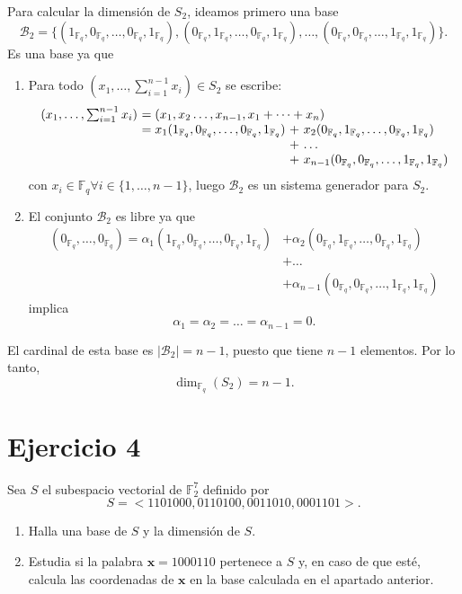\begin{enumerate}[label=\alph*)]
	Para calcular la dimensión de $S_2$, ideamos primero una base
	\[\mathcal{B}_2 = \{(1_{\mathbb{F}_q},0_{\mathbb{F}_q},\dots,0_{\mathbb{F}_q},1_{\mathbb{F}_q}), (0_{\mathbb{F}_q},1_{\mathbb{F}_q},\dots,0_{\mathbb{F}_q},1_{\mathbb{F}_q}),\dots,(0_{\mathbb{F}_q},0_{\mathbb{F}_q},\dots,1_{\mathbb{F}_q},1_{\mathbb{F}_q})\}.\]
	Es una base ya que
	\begin{enumerate}[label=\arabic*)]
		\item Para todo $(x_1,\dots,\sum_{i=1}^{n-1}x_i)\in S_2$ se escribe:
		\[
			\begin{array}{r@{\ }l@{\ }l@{\ }l}
				(x_1,\dots,\sum_{i=1}^{n-1}x_i)&= \mathrlap{(x_1,x_2\dots,x_{n-1},x_1+\dots+x_n)}\\
				&= x_1(1_{\mathbb{F}_q},0_{\mathbb{F}_q},\dots,0_{\mathbb{F}_q},1_{\mathbb{F}_q}) &+& x_2(0_{\mathbb{F}_q},1_{\mathbb{F}_q},\dots,0_{\mathbb{F}_q},1_{\mathbb{F}_q})\\
				&	&+& \dots\\
				&	&+& x_{n-1}(0_{\mathbb{F}_q},0_{\mathbb{F}_q},\dots,1_{\mathbb{F}_q},1_{\mathbb{F}_q})
			\end{array}
		\]
		con $x_i\in\mathbb{F}_q\forall i\in\{1,\dots,n-1\}$, luego $\mathcal{B}_2$ es un sistema generador para $S_2$.
		
		\item El conjunto $\mathcal{B}_2$ es libre ya que
		\begin{align*}
			(0_{\mathbb{F}_q},\dots,0_{\mathbb{F}_q}) = \alpha_1(1_{\mathbb{F}_q},0_{\mathbb{F}_q},\dots,0_{\mathbb{F}_q},1_{\mathbb{F}_q}) &+ \alpha_2(0_{\mathbb{F}_q},1_{\mathbb{F}_q},\dots,0_{\mathbb{F}_q},1_{\mathbb{F}_q})\\
			&+ \dots\\
			&+ \alpha_{n-1}(0_{\mathbb{F}_q},0_{\mathbb{F}_q},\dots,1_{\mathbb{F}_q},1_{\mathbb{F}_q})
		\end{align*}
		implica
		\[\alpha_1=\alpha_2=\dots=\alpha_{n-1}=0.\]
	\end{enumerate}
	El cardinal de esta base es $|\mathcal{B}_2| = n-1$, puesto que tiene $n-1$ elementos. Por lo tanto,
	\[\dim_{\mathbb{F}_q}(S_2) = n-1.\]
\end{enumerate}

\section{Ejercicio 4}

\begin{formulationBox}
	Sea $S$ el subespacio vectorial de $\mathbb{F}_2^7$ definido por
	\[S=<1101000, 0110100, 0011010, 0001101>.\]
	\begin{enumerate}[label=\alph*)]
		\item Halla una base de $S$ y la dimensión de $S$.
		\item Estudia si la palabra $\textbf{x} = 1000110$ pertenece a $S$ y, en caso de que esté, calcula las coordenadas de $\textbf{x}$ en la base calculada en el apartado anterior.
	\end{enumerate}
\end{formulationBox}

